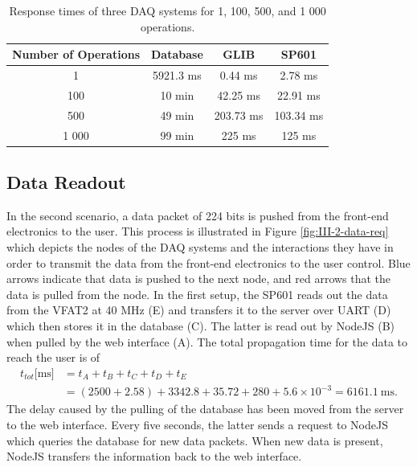       \begin{table}[t!]
        \begin{tabularx}{\textwidth}{C{1}C{1}C{1}C{1}}
          \textbf{Number of Operations} & \textbf{Database} & \textbf{GLIB} & \textbf{SP601} \\      & 5921.3 ms & 0.44 ms   & 2.78 ms \\
          100   & 10 min    & 42.25 ms  & 22.91 ms \\
          500   & 49 min    & 203.73 ms & 103.34 ms \\
          1 000  & 99 min   & 225 ms    & 125 ms
        \end{tabularx}
        \caption{Response times of three DAQ systems for 1, 100, 500, and 1 000 operations.}
        \label{tab:III-2-response}
      \end{table}

    \subsection{Data Readout}

      In the second scenario, a data packet of 224 bits is pushed from the front-end electronics to the user. This process is illustrated in Figure \ref{fig:III-2-data-req} which depicts the nodes of the DAQ systems and the interactions they have in order to transmit the data from the front-end electronics to the user control. Blue arrows indicate that data is pushed to the next node, and red arrows that the data is pulled from the node. In the first setup, the SP601 reads out the data from the VFAT2 at 40 MHz (E) and transfers it to the server over UART (D) which then stores it in the database (C). The latter is read out by NodeJS (B) when pulled by the web interface (A). The total propagation time for the data to reach the user is of
      \begin{equation}
        \begin{split}
          t_{tot}\text{[ms]} & = t_A + t_B + t_C + t_D + t_E \\
                             & = (2500 + 2.58) + 3342.8 + 35.72 + 280 + 5.6 \times 10^{-3} = 6161.1 \ \text{ms}.
        \end{split}
      \end{equation}
      The delay caused by the pulling of the database has been moved from the server to the web interface. Every five seconds, the latter sends a request to NodeJS which queries the database for new data packets. When new data is present, NodeJS transfers the information back to the web interface. \\

